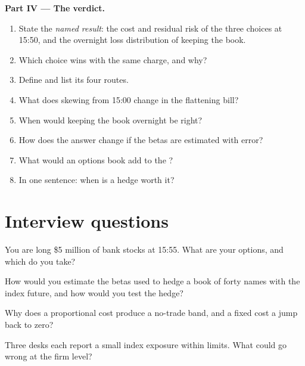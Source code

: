 \begin{problem}
\medskip\noindent\textbf{Part IV --- The verdict.}
\begin{enumerate}[resume]
\item State the \emph{named result}: the cost and residual risk of the three choices at 15:50, and the overnight loss distribution of keeping the book.
\item Which choice wins with the same charge, and why?
\item Define  and list its four routes.
\item What does skewing from 15:00 change in the flattening bill?
\item When would keeping the book overnight be right?
\item How does the answer change if the betas are estimated with error?
\item What would an options book add to the ?
\item In one sentence: when is a hedge worth it?
\end{enumerate}
\end{problem}

\section{Interview questions}

\begin{interviewq}\label{iq:hf:hedging-and-inventory-in-practice:1}
You are long \$5 million of bank stocks at 15:55. What are your options, and which do you take?
\end{interviewq}

\begin{interviewq}\label{iq:hf:hedging-and-inventory-in-practice:2}
How would you estimate the betas used to hedge a book of forty names with the index future, and how would you test the hedge?
\end{interviewq}

\begin{interviewq}\label{iq:hf:hedging-and-inventory-in-practice:3}
Why does a proportional cost produce a no-trade band, and a fixed cost a jump back to zero?
\end{interviewq}

\begin{interviewq}\label{iq:hf:hedging-and-inventory-in-practice:4}
Three desks each report a small index exposure within limits. What could go wrong at the firm level?
\end{interviewq}

